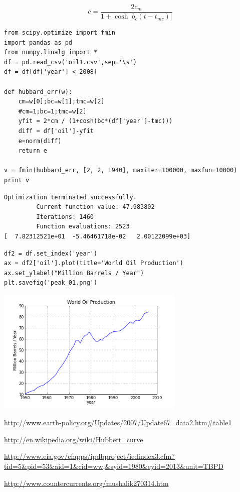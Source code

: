 \documentclass[12pt,fleqn]{article}\usepackage{../common}
\begin{document}
$$ 
c = \frac{ 2c_m}{1 + \cosh |b_c(t-t_{mc})|   }
$$


\begin{verbatim}
from scipy.optimize import fmin
import pandas as pd
from numpy.linalg import *
df = pd.read_csv('oil1.csv',sep='\s')
df = df[df['year'] < 2008]

def hubbard_err(w):
    cm=w[0];bc=w[1];tmc=w[2]
    #cm=1;bc=1;tmc=w[2]
    yfit = 2*cm / (1+cosh(bc*(df['year']-tmc)))
    diff = df['oil']-yfit
    e=norm(diff)
    return e

v = fmin(hubbard_err, [2, 2, 1940], maxiter=100000, maxfun=10000)
print v
\end{verbatim}

\begin{verbatim}
Optimization terminated successfully.
         Current function value: 47.983802
         Iterations: 1460
         Function evaluations: 2523
[  7.82312521e+01  -5.46461718e-02   2.00122099e+03]
\end{verbatim}

\begin{verbatim}
df2 = df.set_index('year')
ax = df2['oil'].plot(title='World Oil Production')
ax.set_ylabel("Million Barrels / Year")
plt.savefig('peak_01.png')
\end{verbatim}




\includegraphics[height=6cm]{peak_01.png}

\url{http://www.earth-policy.org/Updates/2007/Update67_data2.htm#table1}

\url{http://en.wikipedia.org/wiki/Hubbert_curve}

\url{http://www.eia.gov/cfapps/ipdbproject/iedindex3.cfm?tid=5&pid=53&aid=1&cid=ww,&syid=1980&eyid=2013&unit=TBPD}

\url{http://www.countercurrents.org/mushalik270314.htm}
\end{document}
